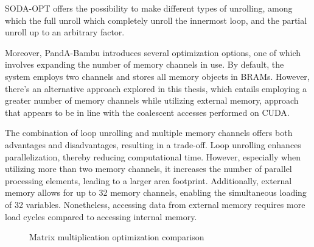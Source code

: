 SODA-OPT offers the possibility to make different types of unrolling, among which the full unroll which completely unroll the innermost loop, and the partial unroll up to an arbitrary factor.

Moreover, PandA-Bambu introduces several optimization options, one of which involves expanding the number of memory channels in use.
By default, the system employs two channels and stores all memory objects in BRAMs.
However, there's an alternative approach explored in this thesis, which entails employing a greater number of memory channels while utilizing external memory, approach that appears to be in line with the coalescent accesses performed on CUDA.

The combination of loop unrolling and multiple memory channels offers both advantages and disadvantages, resulting in a trade-off.
Loop unrolling enhances parallelization, thereby reducing computational time.
However, especially when utilizing more than two memory channels, it increases the number of parallel processing elements, leading to a larger area footprint.
Additionally, external memory allows for up to 32 memory channels, enabling the simultaneous loading of 32 variables.
Nonetheless, accessing data from external memory requires more load cycles compared to accessing internal memory.

\begin{figure}[t]
    \centering
    \hspace{0.15\textwidth}
    \caption{Matrix multiplication optimization comparison}
    \label{fig:matmul-optimization-comparison}
\end{figure}

